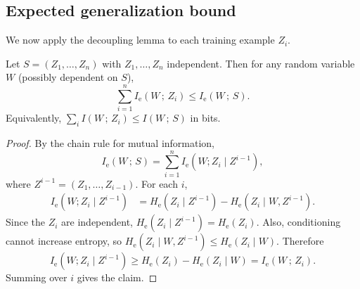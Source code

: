 \documentclass{article}
\numberwithin{equation}{section}
\newcommand{\MI}[2]{I\!\left(#1\,;\,#2\right)}
\newcommand{\MInat}[2]{I_{\mathrm{e}}\!\left(#1\,;\,#2\right)}
\begin{document}
\subsection{Expected generalization bound}

We now apply the decoupling lemma to each training example $Z_i$.

\begin{lemma}
\label{lem:mi-subadd}
Let $S=(Z_1,\dots,Z_n)$ with $Z_1,\dots,Z_n$ independent.
Then for any random variable $W$ (possibly dependent on $S$),
\begin{equation}
    \sum_{i=1}^n \MInat{W}{Z_i} \le \MInat{W}{S}.
\end{equation}
Equivalently, $\sum_i \MI{W}{Z_i} \le \MI{W}{S}$ in bits.
\end{lemma}
\begin{proof}
By the chain rule for mutual information,
\begin{equation}
    \MInat{W}{S} = \sum_{i=1}^n I_{\mathrm{e}}(W;Z_i\mid Z^{i-1}),
\end{equation}
where $Z^{i-1}=(Z_1,\dots,Z_{i-1})$.
For each $i$,
\begin{align}
I_{\mathrm{e}}(W;Z_i\mid Z^{i-1})
&= H_{\mathrm{e}}(Z_i\mid Z^{i-1}) - H_{\mathrm{e}}(Z_i\mid W, Z^{i-1}).
\end{align}
Since the $Z_i$ are independent, $H_{\mathrm{e}}(Z_i\mid Z^{i-1})=H_{\mathrm{e}}(Z_i)$.
Also, conditioning cannot increase entropy, so
$H_{\mathrm{e}}(Z_i\mid W,Z^{i-1}) \le H_{\mathrm{e}}(Z_i\mid W)$.
Therefore
\begin{equation}
    I_{\mathrm{e}}(W;Z_i\mid Z^{i-1})
    \ge H_{\mathrm{e}}(Z_i) - H_{\mathrm{e}}(Z_i\mid W)
    = \MInat{W}{Z_i}.
\end{equation}
Summing over $i$ gives the claim.
\end{proof}
\end{document}
